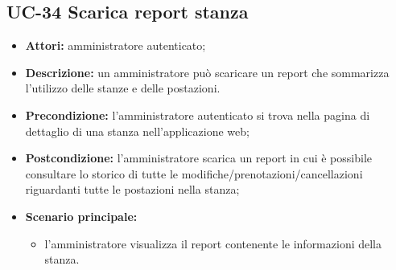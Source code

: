 \subsection{UC-34 Scarica report stanza}
\begin{itemize}
    \item \textbf{Attori:} amministratore autenticato;
    \item \textbf{Descrizione:} un amministratore pu\`{o} scaricare un report che sommarizza l'utilizzo delle stanze e delle postazioni.
    \item \textbf{Precondizione:} l'amministratore autenticato si trova nella pagina di dettaglio di una stanza nell'applicazione web;
    \item \textbf{Postcondizione:} l'amministratore scarica un report in cui \`{e} possibile consultare lo storico di tutte le modifiche/prenotazioni/cancellazioni riguardanti tutte le postazioni nella stanza;
    \item \textbf{Scenario principale:}
    \begin{itemize}
        \item l'amministratore visualizza il report contenente le informazioni della stanza.
    \end{itemize}
\end{itemize}
